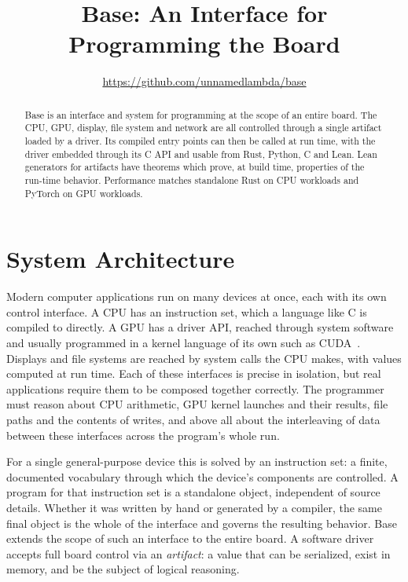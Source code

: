 \documentclass[11pt]{article}
\title{Base: An Interface for Programming the Board}
\author{\url{https://github.com/unnamedlambda/base}}
\date{}
\begin{document}
\maketitle
\begin{abstract}
Base is an interface and system for programming at the scope of an entire board.
The CPU, GPU, display, file system and network are all controlled through a single
artifact loaded by a driver. Its compiled entry points can then be called at
run time, with the driver embedded through its C API and usable from Rust,
Python, C and Lean. Lean generators for artifacts have theorems which prove, at
build time, properties of the run-time behavior. Performance matches standalone
Rust on CPU workloads and PyTorch on GPU workloads.
\end{abstract}

\section{System Architecture}
\label{sec:interface}

Modern computer applications run on many devices at once, each with its own
control interface. A CPU has an instruction set, which a language like C is
compiled to directly. A GPU has a driver API, reached through system software
and usually programmed in a kernel language of its own such as CUDA~\cite{cuda}. Displays
and file systems are reached by system calls the CPU makes, with values computed
at run time. Each of these interfaces is precise in isolation, but real
applications require them to be composed together correctly. The programmer must
reason about CPU arithmetic, GPU kernel launches and their results, file paths
and the contents of writes, and above all about the interleaving of data between
these interfaces across the program's whole run.

For a single general-purpose device this is solved by an instruction set: a
finite, documented vocabulary through which the device's components are
controlled. A program for that instruction set is a standalone object,
independent of source details. Whether it was written by hand or generated by a
compiler, the same final object is the whole of the interface and governs the
resulting behavior. Base extends the scope of such an interface to the entire
board. A software driver accepts full board control via an \emph{artifact}: a
value that can be serialized, exist in memory, and be the subject of logical
reasoning.
\end{document}
